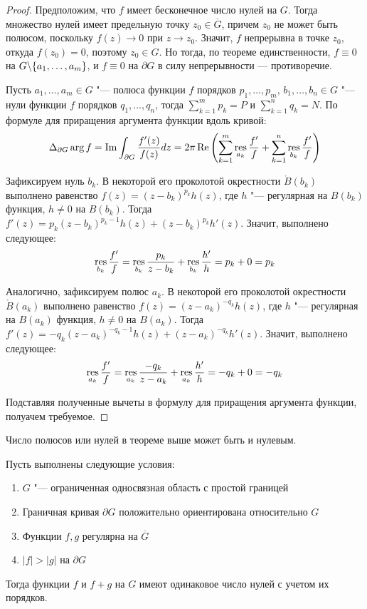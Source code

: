 \begin{proof}
	Предположим, что $f$ имеет бесконечное число нулей на $G$. Тогда множество нулей имеет предельную точку $z_0 \in \overline{G}$, причем $z_0$ не может быть полюсом, поскольку $f(z) \to 0$ при $z \to z_0$. Значит, $f$ непрерывна в точке $z_0$, откуда $f(z_0) = 0$, поэтому $z_0 \in G$. Но тогда, по теореме единственности, $f \equiv 0$ на $G \backslash \{a_1, \dotsc, a_m\}$, и $f \equiv 0$ на $\partial G$ в силу непрерывности --- противоречие.
	
	Пусть $a_1, \dotsc, a_m \in G$ "--- полюса функции $f$ порядков $p_1, \dotsc, p_m$, $b_1, \dots, b_n \in G$ "--- нули функции $f$ порядков $q_1, \dotsc, q_n$, тогда $\sum_{k = 1}^mp_k = P$ и $\sum_{k = 1}^nq_k = N$. По формуле для приращения аргумента функции вдоль кривой:
	\[\Delta_{\partial G} \arg f = \operatorname{Im}\int_{\partial G}\frac{f'(z)}{f(z)}dz = 2\pi\operatorname{Re} \left(\sum_{k = 1}^m\operatorname*{res}_{a_k}\frac{f'}{f} + \sum_{k = 1}^n\operatorname*{res}_{b_k}\frac{f'}{f}\right)\]
	
	Зафиксируем нуль $b_k$. В некоторой его проколотой окрестности $\mathring B(b_k)$ выполнено равенство $f(z) = (z-b_k)^{p_k}h(z)$, где $h$ "--- регулярная на $B(b_k)$ функция, $h \ne 0$ на $B(b_k)$. Тогда $f'(z) = p_k(z-b_k)^{p_k - 1}h(z) + (z-b_k)^{p_k}h'(z)$. Значит, выполнено следующее:
	\[\operatorname*{res}_{b_k}\frac{f'}{f} = \operatorname*{res}_{b_k}\frac{p_k}{z-b_k} + \operatorname*{res}_{b_k}\frac{h'}{h} = p_k + 0 = p_k\]
	
	Аналогично, зафиксируем полюс $a_k$. В некоторой его проколотой окрестности $\mathring B(a_k)$ выполнено равенство $f(z) = (z-a_k)^{-q_k}h(z)$, где $h$ "--- регулярная на $B(a_k)$ функция, $h \ne 0$ на $B(a_k)$. Тогда $f'(z) = -q_k(z-a_k)^{-q_k - 1}h(z) + (z-a_k)^{-q_k}h'(z)$. Значит, выполнено следующее:
	\[\operatorname*{res}_{a_k}\frac{f'}{f} = \operatorname*{res}_{a_k}\frac{-q_k}{z-a_k} + \operatorname*{res}_{a_k}\frac{h'}{h} = -q_k + 0 = -q_k\]
	
	Подставляя полученные вычеты в формулу для приращения аргумента функции, полуачем требуемое.
\end{proof}

\begin{note}
	Число полюсов или нулей в теореме выше может быть и нулевым.
\end{note}

\begin{theorem}[Руше]
	Пусть выполнены следующие условия:
	\begin{enumerate}
		\item $G$ "--- ограниченная односвязная область с простой границей
		
		\item Граничная кривая $\partial G$ положительно ориентирована относительно $G$
		
		\item Функции $f, g$ регулярна на $\overline{G}$
		
		\item $|f| > |g|$ на $\partial G$
	\end{enumerate}
	
	Тогда функции $f$ и $f+g$ на $G$ имеют одинаковое число нулей с учетом их порядков.
\end{theorem}

